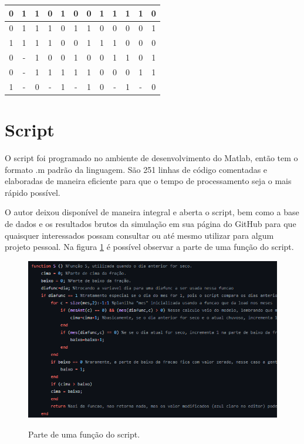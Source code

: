\begin{table}[H]
\begin{tabular}{|c|c|c|c|c|c|c|c|c|c|c|c|}
0 & 1 & 1 & 0 & 1 & 0 & 0 & 1 & 1 & 1 & 1 & 0 \\ \hline
0 & 1 & 1 & 1 & 0 & 1 & 1 & 0 & 0 & 0 & 0 & 1 \\ \hline
1 & 1 & 1 & 1 & 0 & 0 & 1 & 1 & 1 & 0 & 0 & 0 \\ \hline
0 & - & 1 & 0 & 0 & 1 & 0 & 0 & 1 & 1 & 0 & 1 \\ \hline
0 & - & 1 & 1 & 1 & 1 & 1 & 0 & 0 & 0 & 1 & 1 \\ \hline
1 & - & 0 & - & 1 & - & 1 & 0 & - & 1 & - & 0 \\ \hline
\end{tabular}
\vspace*{15px}
\end{table}



\section{Script}
\label{s.io}
O script foi programado no ambiente de desenvolvimento do Matlab, então tem o formato .m padrão da linguagem. São 251 linhas de código comentadas e elaboradas de maneira eficiente para que o tempo de processamento seja o mais rápido possível.

O autor deixou disponível de maneira integral e aberta o script, bem como a base de dados e os resultados brutos da simulação em sua página do GitHub \cite{script-tcc} para que quaisquer interessados possam consultar ou até mesmo utilizar para algum projeto pessoal. Na figura \ref{f.example-script} é possível observar a parte de uma função do script.

\begin{figure}[H]
	\caption{\small Parte de uma função do script.}
	\centering
	\includegraphics[width=\textwidth]{figs/example-script.png}
	\label{f.example-script}
\end{figure}







